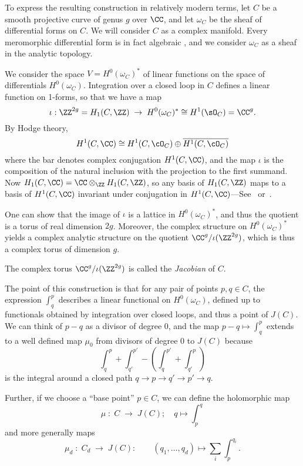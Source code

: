 To express the resulting construction in relatively modern terms, let $C$ be a smooth projective curve of genus $g$ over $\CC$, and let $\omega_{C}$ be the sheaf of differential forms on $C$. We will consider $C$ as a complex manifold. Every meromorphic differential form is in fact algebraic
\cite{SerreGAGA}, and we consider $\omega_{C}$ as a sheaf in the analytic topology.

We consider the space $V = H^0(\omega_C)^*$ of linear functions on the space of differentials $H^0(\omega_C)$.  Integration over a closed loop in $C$ defines a linear function on 1-forms, so that we have a map
$$
\iota: \ZZ^{2g} = H_1(C,\ZZ) \; \to \;  H^0(\omega_C)^* \cong H^1(\sO_C) = \CC^{g}.
$$
By Hodge theory, 
$$
H^1(C, \CC) \cong H^1(C, \cO_C) \oplus \overline{H^1(C, \cO_C)}
$$
where the bar denotes complex conjugation $H^1(C, \CC)$, and the map $\iota$ is the composition of 
 the natural inclusion with the projection to the first summand.
 Now
$H_1(C,\CC) = \CC\otimes_\ZZ H_1(C,\ZZ)$, so any basis of $H_1(C,\ZZ)$ maps to a basis of 
 $H^1(C, \CC)$ invariant under conjugation in $H^1(C, \CC)$---See~\cite{Voisin} or~\cite[p. 116]{Griffiths-Harris1978}. 

One can show that the image of $\iota$ is a lattice in $H^0(\omega_C)^*$, and thus the quotient
is a torus of real dimension $2g$. Moreover, the
complex structure on $H^0(\omega_C)^*$ yields a complex analytic structure on the quotient $\CC^{g}/\iota(\ZZ^{2g})$, which is thus a complex torus of  dimension $g$.  

\begin{definition}
 The complex torus $\CC^{g}/\iota(\ZZ^{2g})$ is called the \emph{Jacobian} of $C$.
\end{definition}

The point of this construction is that for any pair of points $p, q \in C$, the expression $\int_q^p$ describes a linear functional on $H^0(\omega_C)$, defined up to functionals obtained by integration over closed loops, and thus a point of $J(C)$. We can think of $p-q$ as a divisor of
degree 0, and the map $p-q \mapsto \int_q^p$ extends to a well defined map $\mu_0$ from divisors of degree 0 to $J(C)$ because
$$
\int_q^p +\int_{q'}^{p'} - (\int_q^{p'} +\int_{q'}^p) 
$$
is the integral around a closed path $q\to p\to q'\to p' \to q$.

Further, if we choose a ``base point''  $p\in C$, we can define the holomorphic map
$$
\mu \; : \; C \; \to \; J(C); \quad q\mapsto \int_{p}^{q}
$$
and more generally maps
$$
\mu_d \; : \; C_d \; \to \; J(C): \quad  \quad (q_1,\dots, q_d) \mapsto \sum_i \int_{p}^{q_i}.
$$


